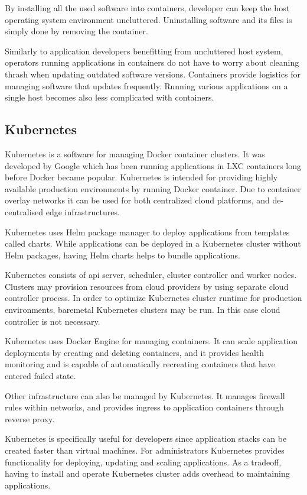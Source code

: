 By installing all the used software into containers, developer can keep the
host operating system environment uncluttered. Uninstalling software and its
files is simply done by removing the container.

Similarly to application developers benefitting from uncluttered host system,
operators running applications in containers do not have to worry about
cleaning thrash when updating outdated software versions. Containers provide
logistics for managing software that updates frequently. Running various
applications on a single host becomes also less complicated with containers.

\subsection{Kubernetes}

Kubernetes \cite{kubernetes} is a software for managing Docker container
clusters. It was developed by Google which has been running applications in LXC
containers long before Docker became popular. Kubernetes is intended for
providing highly available production environments by running Docker container.
Due to container overlay networks it can be used for both centralized cloud
platforms, and de-centralised edge infrastructures.

Kubernetes uses Helm package manager to deploy applications from templates
called charts. While applications can be deployed in a Kubernetes cluster
without Helm packages, having Helm charts helps to bundle applications.

Kubernetes consists of api server, scheduler, cluster controller and worker
nodes. Clusters may provision resources from cloud providers by using separate
cloud controller process. In order to optimize Kubernetes cluster runtime for
production environments, baremetal Kubernetes clusters may be run. In this case
cloud controller is not necessary.

Kubernetes uses Docker Engine for managing containers. It can scale application
deployments by creating and deleting containers, and it provides health
monitoring and is capable of automatically recreating containers that have
entered failed state.

Other infrastructure can also be managed by Kubernetes. It manages firewall
rules within networks, and provides ingress to application containers through
reverse proxy.

Kubernetes is specifically useful for developers since application stacks can
be created faster than virtual machines. For administrators Kubernetes provides
functionality for deploying, updating and scaling applications. As a tradeoff,
having to install and operate Kubernetes cluster adds overhead to maintaining
applications.

